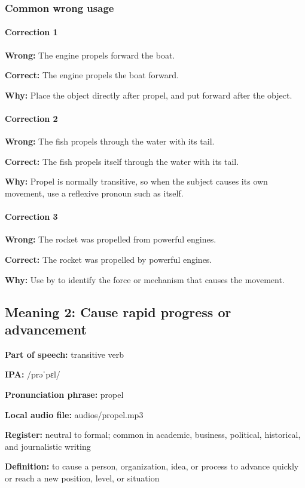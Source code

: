 \documentclass[11pt]{article}
\begin{document}
\subsubsection{Common wrong usage}
\paragraph{Correction 1}
\textbf{Wrong:} The engine propels forward the boat.

\textbf{Correct:} The engine propels the boat forward.

\textbf{Why:} Place the object directly after propel, and put forward after the object.

\paragraph{Correction 2}
\textbf{Wrong:} The fish propels through the water with its tail.

\textbf{Correct:} The fish propels itself through the water with its tail.

\textbf{Why:} Propel is normally transitive, so when the subject causes its own movement, use a reflexive pronoun such as itself.

\paragraph{Correction 3}
\textbf{Wrong:} The rocket was propelled from powerful engines.

\textbf{Correct:} The rocket was propelled by powerful engines.

\textbf{Why:} Use by to identify the force or mechanism that causes the movement.

\subsection{Meaning 2: Cause rapid progress or advancement}
\textbf{Part of speech:} transitive verb

\textbf{IPA:} /prəˈpɛl/

\textbf{Pronunciation phrase:} propel

\textbf{Local audio file:} audios/propel.mp3

\textbf{Register:} neutral to formal; common in academic, business, political, historical, and journalistic writing

\textbf{Definition:} to cause a person, organization, idea, or process to advance quickly or reach a new position, level, or situation
\end{document}

